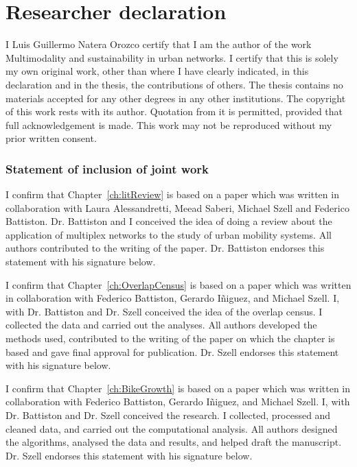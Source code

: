 \documentclass[a4paper,twoside,12pt]{book}
\begin{document}
\pagestyle{empty}

\newpage


\chapter*{Researcher declaration}
I Luis Guillermo Natera Orozco certify that I am the author of the work Multimodality and sustainability in urban networks. I certify that this is solely my own original work, other than where I have clearly indicated, in this declaration and in the thesis, the contributions of others. The thesis contains no materials accepted for any other degrees in any other institutions.  The copyright of this work rests with its author. Quotation from it is permitted, provided that full acknowledgement is made. This work may not be reproduced without my prior written consent.

\subsection*{Statement of inclusion of joint work}
I confirm that Chapter~\ref{ch:litReview} is based on a paper which was written in collaboration with Laura Alessandretti, Meead Saberi, Michael Szell and Federico Battiston. Dr. Battiston and I conceived the idea of doing a review about the application of multiplex networks to the study of urban mobility systems. All authors contributed to the writing of the paper. Dr. Battiston endorses this statement with his signature below.

\vspace{.2cm}

I confirm that Chapter~\ref{ch:OverlapCensus} is based on a paper which was written in collaboration with Federico Battiston, Gerardo I\~niguez, and Michael Szell. I, with Dr. Battiston and Dr. Szell conceived the idea of the overlap census. I collected the data and carried out the analyses. All authors developed the methods used, contributed to the writing of the paper on which the chapter is based and gave final approval for publication. Dr. Szell endorses this statement with his signature below.

\vspace{.2cm}

I confirm that Chapter~\ref{ch:BikeGrowth} is based on a paper which was written in collaboration with Federico Battiston, Gerardo I\~niguez, and Michael Szell. I, with Dr. Battiston and Dr. Szell conceived the research. I collected, processed and cleaned data, and carried out the computational analysis. All authors designed the algorithms, analysed the data and results, and helped draft the manuscript. Dr. Szell endorses this statement with his signature below.
\end{document}
